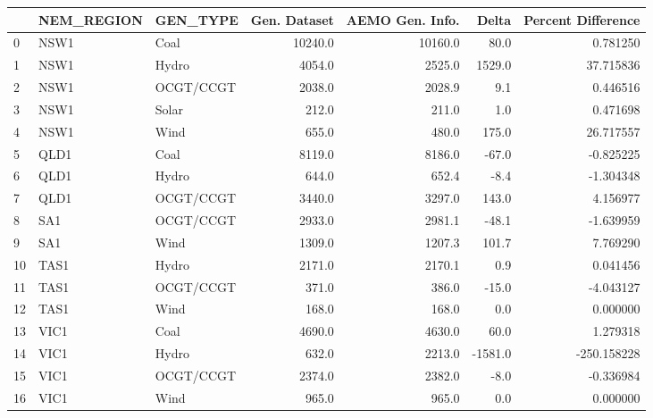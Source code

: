 \begin{tabular}{lllrrrr}
\toprule
{} & NEM\_REGION &   GEN\_TYPE &  Gen. Dataset &  AEMO Gen. Info. &   Delta &  Percent Difference \\
\midrule
0  &       NSW1 &       Coal &       10240.0 &          10160.0 &    80.0 &            0.781250 \\
1  &       NSW1 &      Hydro &        4054.0 &           2525.0 &  1529.0 &           37.715836 \\
2  &       NSW1 &  OCGT/CCGT &        2038.0 &           2028.9 &     9.1 &            0.446516 \\
3  &       NSW1 &      Solar &         212.0 &            211.0 &     1.0 &            0.471698 \\
4  &       NSW1 &       Wind &         655.0 &            480.0 &   175.0 &           26.717557 \\
5  &       QLD1 &       Coal &        8119.0 &           8186.0 &   -67.0 &           -0.825225 \\
6  &       QLD1 &      Hydro &         644.0 &            652.4 &    -8.4 &           -1.304348 \\
7  &       QLD1 &  OCGT/CCGT &        3440.0 &           3297.0 &   143.0 &            4.156977 \\
8  &        SA1 &  OCGT/CCGT &        2933.0 &           2981.1 &   -48.1 &           -1.639959 \\
9  &        SA1 &       Wind &        1309.0 &           1207.3 &   101.7 &            7.769290 \\
10 &       TAS1 &      Hydro &        2171.0 &           2170.1 &     0.9 &            0.041456 \\
11 &       TAS1 &  OCGT/CCGT &         371.0 &            386.0 &   -15.0 &           -4.043127 \\
12 &       TAS1 &       Wind &         168.0 &            168.0 &     0.0 &            0.000000 \\
13 &       VIC1 &       Coal &        4690.0 &           4630.0 &    60.0 &            1.279318 \\
14 &       VIC1 &      Hydro &         632.0 &           2213.0 & -1581.0 &         -250.158228 \\
15 &       VIC1 &  OCGT/CCGT &        2374.0 &           2382.0 &    -8.0 &           -0.336984 \\
16 &       VIC1 &       Wind &         965.0 &            965.0 &     0.0 &            0.000000 \\
\bottomrule
\end{tabular}
